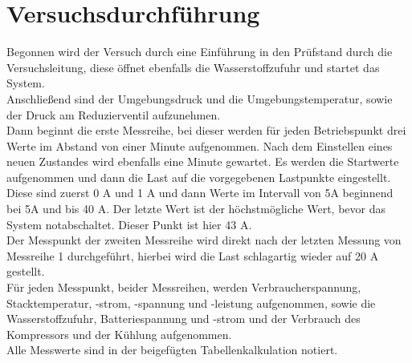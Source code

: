 \section{Versuchsdurchführung}
\label{section:Versuchsdurchführung}

Begonnen wird der Versuch durch eine Einführung in den Prüfstand durch die Versuchsleitung, diese öffnet ebenfalls die Wasserstoffzufuhr und startet das System.\\
Anschließend sind der Umgebungsdruck und die Umgebungstemperatur, sowie der Druck am Reduzierventil aufzunehmen.\\
Dann beginnt die erste Messreihe, bei dieser werden für jeden Betriebspunkt drei Werte im Abstand von einer Minute aufgenommen.
Nach dem Einstellen eines neuen Zustandes wird ebenfalls eine Minute gewartet.
Es werden die Startwerte aufgenommen und dann die Last auf die vorgegebenen Lastpunkte
eingestellt. Diese sind zuerst 0 A und 1 A und dann Werte im Intervall von 5A beginnend bei 5A und bis 40 A. Der letzte Wert ist der höchstmögliche Wert, bevor das System notabschaltet.
Dieser Punkt ist hier 43 A.\\
Der Messpunkt der zweiten Messreihe wird direkt nach der letzten Messung von Messreihe 1 durchgeführt, hierbei wird die Last schlagartig wieder auf 20 A gestellt.\\
Für jeden Messpunkt, beider Messreihen, werden Verbraucherspannung, Stacktemperatur, -strom, -spannung und -leistung aufgenommen, sowie die Wasserstoffzufuhr, Batteriespannung und -strom und der Verbrauch des Kompressors und der Kühlung aufgenommen.\\
Alle Messwerte sind in der beigefügten Tabellenkalkulation notiert.\\